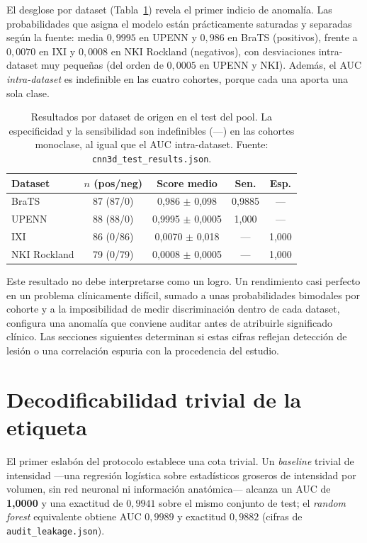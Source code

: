 El desglose por dataset (Tabla~\ref{tab:pool_perdataset}) revela el primer
indicio de anomalía. Las probabilidades que asigna el modelo están
prácticamente saturadas y separadas según la fuente: media $0{,}9995$ en UPENN y
$0{,}986$ en BraTS (positivos), frente a $0{,}0070$ en IXI y $0{,}0008$ en NKI
Rockland (negativos), con desviaciones intra-dataset muy pequeñas (del orden de
$0{,}0005$ en UPENN y NKI). Además, el AUC \emph{intra-dataset} es indefinible
en las cuatro cohortes, porque cada una aporta una sola clase.

\begin{table}[ht]
  \centering
  \caption[Resultados por dataset en el pool]{Resultados por dataset de origen en
  el test del pool. La especificidad y la sensibilidad son indefinibles
  (---) en las cohortes monoclase, al igual que el AUC intra-dataset. Fuente:
  \texttt{cnn3d\_test\_results.json}.}
  \label{tab:pool_perdataset}
  \begin{tabular}{l c c c c}
    \hline
    \textbf{Dataset} & \textbf{$n$ (pos/neg)} & \textbf{Score medio} & \textbf{Sen.} & \textbf{Esp.} \\
    \hline
    BraTS        & 87 (87/0)  & 0,986 $\pm$ 0,098  & 0,9885 & --- \\
    UPENN        & 88 (88/0)  & 0,9995 $\pm$ 0,0005 & 1,000  & --- \\
    IXI          & 86 (0/86)  & 0,0070 $\pm$ 0,018 & ---    & 1,000 \\
    NKI Rockland & 79 (0/79)  & 0,0008 $\pm$ 0,0005 & ---    & 1,000 \\
    \hline
  \end{tabular}
\end{table}

Este resultado no debe interpretarse como un logro. Un rendimiento casi
perfecto en un problema clínicamente difícil, sumado a unas probabilidades
bimodales por cohorte y a la imposibilidad de medir discriminación dentro de
cada dataset, configura una anomalía que conviene auditar antes de atribuirle
significado clínico. Las secciones
siguientes determinan si estas cifras reflejan detección de lesión o una
correlación espuria con la procedencia del estudio.

\section{Decodificabilidad trivial de la etiqueta}

El primer eslabón del protocolo establece una cota trivial. Un \emph{baseline}
trivial de intensidad ---una regresión logística sobre estadísticos groseros de
intensidad por volumen, sin red neuronal ni información anatómica--- alcanza un
AUC de \textbf{1,0000} y una exactitud de $0{,}9941$ sobre el mismo conjunto de
test; el \emph{random forest} equivalente obtiene AUC $0{,}9989$ y exactitud
$0{,}9882$ (cifras de \texttt{audit\_leakage.json}).

